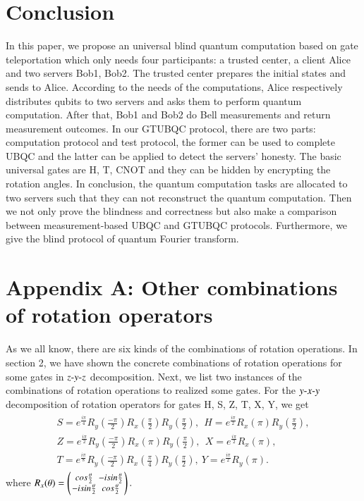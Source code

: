 \documentclass[aps,pra,showpacs,twocolumn,superscriptaddress]{revtex4-1}
\begin{document}
\section{Conclusion}
\label{sec:con}
In this paper, we propose an universal blind quantum computation based on gate teleportation which only needs four participants: a trusted center, a client Alice and two servers Bob1, Bob2. The trusted center prepares the initial states and sends to Alice. According to the needs of the computations, Alice respectively distributes qubits to two servers and asks them to perform quantum computation. After that, Bob1 and Bob2 do Bell measurements and return measurement outcomes. In our GTUBQC protocol, there are two parts: computation protocol and test protocol, the former can be used to complete UBQC and the latter can be applied to detect the servers' honesty. The basic universal gates are H, T, CNOT and they can be hidden by encrypting the rotation angles. In conclusion, the quantum computation tasks are allocated to two servers such that they can not reconstruct the quantum computation. Then we not only prove the blindness and correctness but also make a comparison between measurement-based UBQC and GTUBQC protocols. Furthermore, we give the blind protocol of quantum Fourier transform.

\section*{Appendix A: Other combinations of rotation operators}
As we all know, there are six kinds of the combinations of rotation operations. In section 2, we have shown the concrete combinations of rotation operations for some gates in $z\textnormal{-}y\textnormal{-}z$ decomposition. Next, we list two instances of the combinations of rotation operations to realized some gates. For the $y\textnormal{-}x\textnormal{-}y$ decomposition of rotation operators for gates H, S, Z, T, X, Y, we get
\begin{eqnarray*}
\begin{array}{l}
\displaystyle S=e^{\frac{i \pi}{4}}R_y(\frac{-\pi}{2})R_x(\frac{\pi}{2})R_y(\frac{\pi}{2}), \ \ H=e^{\frac{i\pi}{2}}R_x(\pi)R_y(\frac{\pi}{2}),\\
\displaystyle Z=e^{\frac{i \pi}{2}}R_y(\frac{-\pi}{2})R_x(\pi)R_y(\frac{\pi}{2}),\ \ X=e^{\frac{i\pi}{2}}R_x(\pi),\\
\displaystyle T=e^{\frac{i \pi}{8}}R_y(\frac{-\pi}{2})R_x(\frac{\pi}{4})R_y(\frac{\pi}{2}),\ Y=e^{\frac{i \pi}{2}}R_y(\pi).
\end{array}
\end{eqnarray*}
where $\small
\setlength{\arraycolsep}{1.2pt}
R_x(\theta)=\left(
  \begin{array}{cc}
  cos\frac{\theta}{2}   &-isin\frac{\theta}{2} \\
  -isin\frac{\theta}{2} &  cos\frac{\theta}{2}\\
  \end{array}
\right).$
\end{document}
